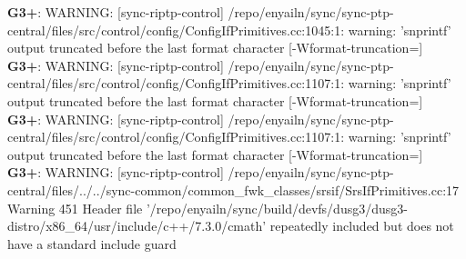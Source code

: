 \documentclass[12pt,twoside]{article}
\begin{document}
\textbf{G3+}: WARNING: [sync-riptp-control] /repo/enyailn/sync/sync-ptp-central/files/src/control/config/ConfigIfPrimitives.cc:1045:1: warning: 'snprintf' output truncated before the last format character [-Wformat-truncation=]\\ 
\textbf{G3+}: WARNING: [sync-riptp-control] /repo/enyailn/sync/sync-ptp-central/files/src/control/config/ConfigIfPrimitives.cc:1107:1: warning: 'snprintf' output truncated before the last format character [-Wformat-truncation=]\\ 
\textbf{G3+}: WARNING: [sync-riptp-control] /repo/enyailn/sync/sync-ptp-central/files/src/control/config/ConfigIfPrimitives.cc:1107:1: warning: 'snprintf' output truncated before the last format character [-Wformat-truncation=]\\ 
\textbf{G3+}: WARNING: [sync-riptp-control] /repo/enyailn/sync/sync-ptp-central/files/../../sync-common/common\_fwk\_classes/srsif/SrsIfPrimitives.cc:17 Warning 451 Header file '/repo/enyailn/sync/build/devfs/dusg3/dusg3-distro/x86\_64/usr/include/c++/7.3.0/cmath' repeatedly included but does not have a standard include guard\\ 
  
\end{document}
